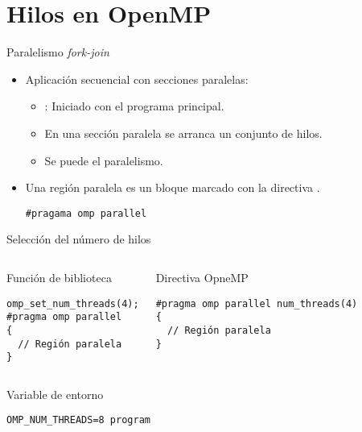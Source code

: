 \section{Hilos en OpenMP}

\begin{frame}[t,fragile]{Paralelismo \emph{fork-join}}
\begin{itemize}
  \item Aplicación secuencial con secciones paralelas:
    \begin{itemize}
      \item {}: Iniciado con el programa principal.
      \item En una sección paralela se arranca un conjunto de hilos.
      \item Se puede  el paralelismo.
    \end{itemize}

  \item Una región paralela es un bloque marcado con la directiva .
\begin{lstlisting}
#pragama omp parallel
\end{lstlisting}
\end{itemize}
\end{frame}

\begin{frame}[t,fragile]{Selección del número de hilos}
\begin{columns}[T]

\begin{block}{Función de biblioteca}
\begin{lstlisting}[basicstyle=\tiny]
omp_set_num_threads(4);
#pragma omp parallel
{
  // Región paralela
}
\end{lstlisting}
\end{block}

\begin{block}{Directiva OpneMP}
\begin{lstlisting}[basicstyle=\tiny]
#pragma omp parallel num_threads(4)
{
  // Región paralela
}
\end{lstlisting}
\end{block}
\end{columns}

\begin{columns}



\begin{block}{Variable de entorno}
\begin{lstlisting}[style=terminal,basicstyle=\tiny]
OMP_NUM_THREADS=8 program
\end{lstlisting}
\end{block}

\end{columns}

\end{frame}

